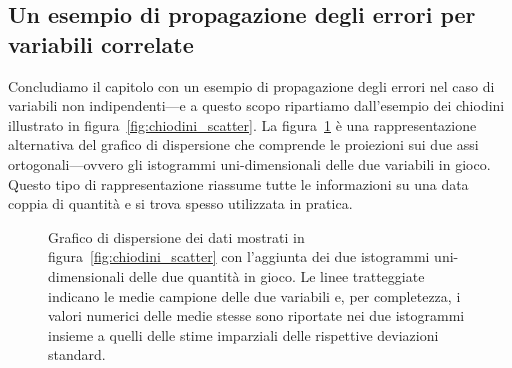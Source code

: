\subsection{Un esempio di propagazione degli errori per variabili correlate}

Concludiamo il capitolo con un esempio di propagazione degli errori nel caso di
variabili non indipendenti---e a questo scopo ripartiamo dall'esempio dei chiodini
illustrato in figura~\ref{fig:chiodini_scatter}. La figura~\ref{fig:chiodini_scatter_hist} è
una rappresentazione alternativa del grafico di dispersione che comprende le
proiezioni sui due assi ortogonali---ovvero gli istogrammi uni-dimensionali delle
due variabili in gioco. Questo tipo di rappresentazione riassume tutte le informazioni
su una data coppia di quantità e si trova spesso utilizzata in pratica.

\begin{figure}[!htb]
  \centering
  \caption{Grafico di dispersione dei dati mostrati in
    figura~\ref{fig:chiodini_scatter} con l'aggiunta dei due istogrammi
    uni-dimensionali delle due quantità in gioco. Le linee tratteggiate
    indicano le medie campione delle due variabili e, per completezza, i
    valori numerici delle medie stesse sono riportate nei due istogrammi insieme
    a quelli delle stime imparziali delle rispettive deviazioni standard.}
  \label{fig:chiodini_scatter_hist}
\end{figure}

